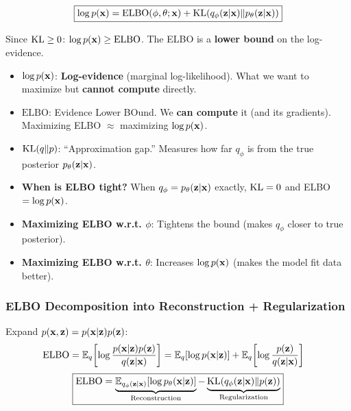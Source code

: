 \begin{equation}\label{eq:elbo_fundamental}
\boxed{\log p(\mathbf{x}) = \text{ELBO}(\phi,\theta;\mathbf{x}) + \text{KL}(q_\phi(\mathbf{z}|\mathbf{x}) \| p_\theta(\mathbf{z}|\mathbf{x}))}
\end{equation}

Since $\text{KL} \geq 0$: $\log p(\mathbf{x}) \geq \text{ELBO}$. The ELBO is a \textbf{lower bound} on the log-evidence.

\begin{keybox}
\begin{itemize}
\item $\log p(\mathbf{x})$: \textbf{Log-evidence} (marginal log-likelihood). What we want to maximize but \textbf{cannot compute} directly.
\item $\text{ELBO}$: Evidence Lower BOund. We \textbf{can compute} it (and its gradients). Maximizing ELBO $\approx$ maximizing $\log p(\mathbf{x})$.
\item $\text{KL}(q \| p)$: ``Approximation gap.'' Measures how far $q_\phi$ is from the true posterior $p_\theta(\mathbf{z}|\mathbf{x})$.
\item \textbf{When is ELBO tight?} When $q_\phi = p_\theta(\mathbf{z}|\mathbf{x})$ exactly, $\text{KL} = 0$ and ELBO $= \log p(\mathbf{x})$.
\item \textbf{Maximizing ELBO w.r.t. $\phi$}: Tightens the bound (makes $q_\phi$ closer to true posterior).
\item \textbf{Maximizing ELBO w.r.t. $\theta$}: Increases $\log p(\mathbf{x})$ (makes the model fit data better).
\end{itemize}
\end{keybox}

\subsubsection{ELBO Decomposition into Reconstruction + Regularization}
Expand $p(\mathbf{x},\mathbf{z}) = p(\mathbf{x}|\mathbf{z})p(\mathbf{z})$:
\begin{align}
\text{ELBO} &= \mathbb{E}_q\!\left[\log\frac{p(\mathbf{x}|\mathbf{z})p(\mathbf{z})}{q(\mathbf{z}|\mathbf{x})}\right] = \mathbb{E}_q[\log p(\mathbf{x}|\mathbf{z})] + \mathbb{E}_q\!\left[\log\frac{p(\mathbf{z})}{q(\mathbf{z}|\mathbf{x})}\right] \nonumber
\end{align}
\begin{equation}\label{eq:elbo_decomposed}
\boxed{\text{ELBO} = \underbrace{\mathbb{E}_{q_\phi(\mathbf{z}|\mathbf{x})}[\log p_\theta(\mathbf{x}|\mathbf{z})]}_{\text{Reconstruction}} - \underbrace{\text{KL}(q_\phi(\mathbf{z}|\mathbf{x}) \| p(\mathbf{z}))}_{\text{Regularization}}}
\end{equation}

